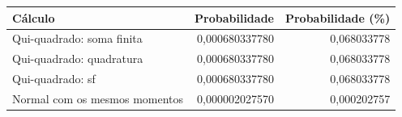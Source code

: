 \begin{tabular}{lrr}
\toprule
Cálculo & Probabilidade & Probabilidade (\%) \\
\midrule
Qui-quadrado: soma finita & 0,000680337780 & 0,068033778 \\
Qui-quadrado: quadratura & 0,000680337780 & 0,068033778 \\
Qui-quadrado: sf & 0,000680337780 & 0,068033778 \\
Normal com os mesmos momentos & 0,000002027570 & 0,000202757 \\
\bottomrule
\end{tabular}

